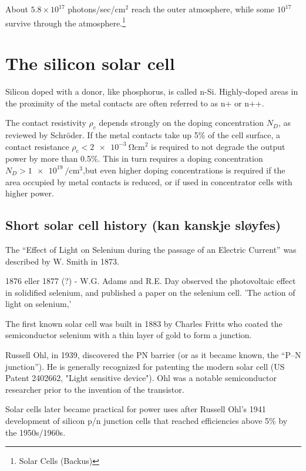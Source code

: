 \documentclass[11pt,bibliography=totoc,index=totoc]{scrbook}   %
\begin{document}
About $5.8\times 10^{17}$ photons/sec/cm$^2$ reach the outer atmosphere, while
some $10^{17}$ survive through the atmosphere.\footnote{Solar Cells (Backus)}

\section{The silicon solar cell}

Silicon doped with a donor, like phosphorus, is called n-Si. Highly-doped areas in the proximity of the metal contacts are often referred to as n+ or n++.

The contact resistivity $\rho_c$ depends strongly on the doping concentration $N_D$, as reviewed by Schröder\cite{Schroder:1984}. 
If the metal contacts take up 5\% of the cell surface, a contact resistance $\rho_c < \SI{2e-3}{\ohm\centi\metre\squared}$ is required to not degrade the output power by more than 0.5\%. This in turn requires a doping concentration $N_D > \SI{1e19}{\per\centi\metre\cubed}$,but even higher doping concentrations is required if the area occupied by metal contacts is reduced, or if used in concentrator cells with higher power.

\subsection{Short solar cell history (kan kanskje sløyfes)}

The ``Effect of Light on Selenium during the passage of an Electric Current''
was described by W. Smith in 1873\cite{Smith:1873}.

1876 eller 1877 (?) - W.G. Adams and R.E. Day observed the photovoltaic effect in solidified 
selenium, and published a paper on the selenium cell. 'The action of light 
on selenium,'\cite{Adams:1876}

The first known solar cell was built in 1883 by Charles Fritts who coated the
semiconductor selenium with a thin layer of gold to form a junction.

Russell Ohl, in 1939, discovered the PN barrier (or as it became known, 
the “P–N junction”). He is generally recognized for patenting the modern solar 
cell (US Patent 2402662, "Light sensitive device"). Ohl was a notable 
semiconductor researcher prior to the invention of the transistor. 

Solar cells later became practical for power uses after Russell Ohl's 1941 
development of silicon p/n junction cells that reached efficiencies above 
5\% by the 1950s/1960s.
\end{document}
